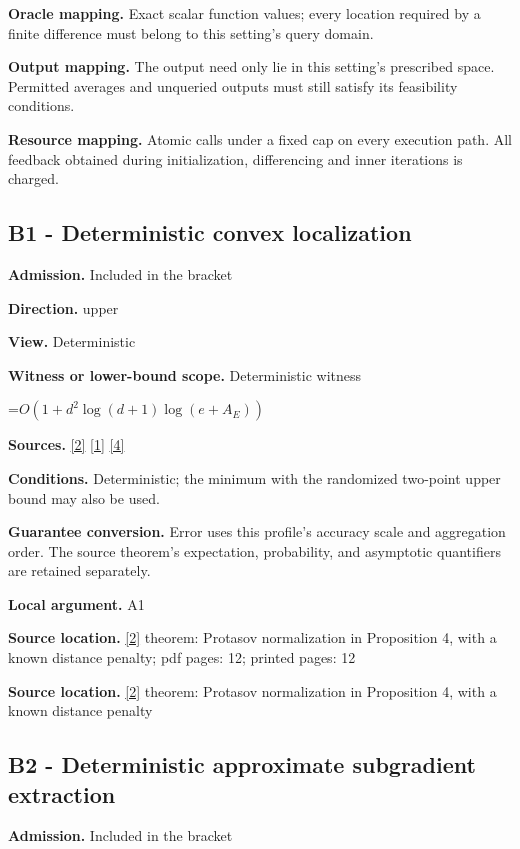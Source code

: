 \documentclass[10pt,a4paper]{article}
\newcommand{\AtlasMath}[1]{\par\begingroup\centering\setbox0=\hbox{$\displaystyle #1$}\ifdim\wd0>1.4\linewidth\typeout{ATLAS WIDE FORMULA: \the\wd0}\fi\ifdim\wd0>\linewidth\resizebox{\linewidth}{!}{\box0}\else\box0\fi\par\endgroup}
\begin{document}
\textbf{Oracle mapping.} Exact scalar function values; every location required by a finite difference must belong to this setting's query domain.

\textbf{Output mapping.} The output need only lie in this setting's prescribed space. Permitted averages and unqueried outputs must still satisfy its feasibility conditions.

\textbf{Resource mapping.} Atomic calls under a fixed cap on every execution path. All feedback obtained during initialization, differencing and inner iterations is charged.

\subsection{B1 - Deterministic convex localization}
\textbf{Admission.} Included in the bracket

\textbf{Direction.} upper

\textbf{View.} Deterministic

\textbf{Witness or lower-bound scope.} Deterministic witness

\AtlasMath{O(1+d^2\log(d+1)\log(e+A_E))}
\textbf{Sources.} \href{https://arxiv.org/html/2607.16558v2}{[2]} \href{https://arxiv.org/html/2610.00345v1}{[1]} \href{https://www.mathnet.ru/php/archive.phtml?jrnid=mzm&option_lang=eng&paperid=1697&wshow=paper}{[4]}

\textbf{Conditions.} Deterministic; the minimum with the randomized two-point upper bound may also be used.

\textbf{Guarantee conversion.} Error uses this profile's accuracy scale and aggregation order. The source theorem's expectation, probability, and asymptotic quantifiers are retained separately.

\textbf{Local argument.} A1

\textbf{Source location.} \href{https://arxiv.org/html/2607.16558v2}{[2]} theorem: Protasov normalization in Proposition 4, with a known distance penalty; pdf pages: 12; printed pages: 12

\textbf{Source location.} \href{https://arxiv.org/html/2607.16558v2}{[2]} theorem: Protasov normalization in Proposition 4, with a known distance penalty

\subsection{B2 - Deterministic approximate subgradient extraction}
\textbf{Admission.} Included in the bracket
\end{document}
